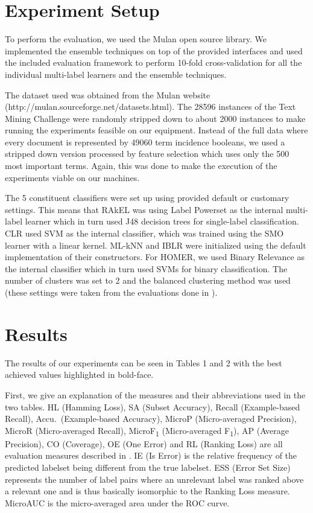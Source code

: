 \section{Experiment Setup}
To perform the evaluation, we used the Mulan \cite{mulan} open source
library. We implemented the ensemble techniques on top of the provided
interfaces and used the included evaluation framework to perform
10-fold cross-validation for all the individual multi-label learners
and the ensemble techniques.

The dataset used was obtained from the Mulan website
(http://mulan.sourceforge.net/datasets.html). The 28596 instances of
the Text Mining Challenge were randomly stripped down to about 2000
instances to make running the experiments feasible on our
equipment. Instead of the full data where every document is
represented by 49060 term incidence booleans, we used a stripped down
version processed by feature selection which uses only the 500 most
important terms. Again, this was done to make the execution of the
experiments viable on our machines.

The 5 constituent classifiers were set up using provided default or
customary settings. This means that RAkEL was using Label Powerset as
the internal multi-label learner which in turn used J48 decision trees
for single-label classification. CLR used SVM as the internal
classifier, which was trained using the SMO learner with a linear
kernel. ML-kNN and IBLR were initialized using the default
implementation of their constructors. For HOMER, we used Binary
Relevance as the internal classifier which in turn used SVMs for
binary classification. The number of clusters was set to 2 and the
balanced clustering method was used (these settings were taken from
the evaluations done in \cite{homer}).

\section{Results}




The results of our experiments can be seen in Tables 1 and 2 with the
best achieved values highlighted in bold-face.

First, we give an explanation of the measures and their abbreviations
used in the two tables. HL (Hamming Loss), SA (Subset Accuracy),
Recall (Example-based Recall), Accu.\ (Example-based Accuracy), MicroP
(Micro-averaged Precision), MicroR (Micro-averaged Recall),
MicroF\textsubscript{1} (Micro-averaged F\textsubscript{1}), AP
(Average Precision), CO (Coverage), OE (One Error) and RL (Ranking
Loss) are all evaluation measures described in \cite{MLLSlides}. IE
(Is Error) is the relative frequency of the predicted labelset being
different from the true labelset. ESS (Error Set Size) represents the
number of label pairs where an unrelevant label was ranked above a
relevant one and is thus basically isomorphic to the Ranking Loss
measure. MicroAUC is the micro-averaged area under the ROC curve.

